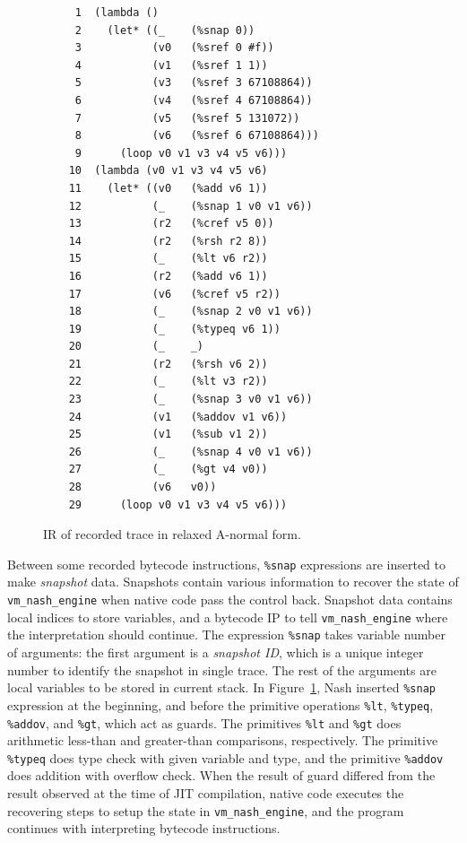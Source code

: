 \documentclass[preprint, 10pt]{sigplanconf}
\begin{document}
\begin{figure}
  \centering
  \small
\begin{verbatim}
     1	(lambda ()
     2    (let* ((_    (%snap 0))
     3           (v0   (%sref 0 #f))
     4           (v1   (%sref 1 1))
     5           (v3   (%sref 3 67108864))
     6           (v4   (%sref 4 67108864))
     7           (v5   (%sref 5 131072))
     8           (v6   (%sref 6 67108864)))
     9      (loop v0 v1 v3 v4 v5 v6)))
    10	(lambda (v0 v1 v3 v4 v5 v6)
    11    (let* ((v0   (%add v6 1))
    12           (_    (%snap 1 v0 v1 v6))
    13           (r2   (%cref v5 0))
    14           (r2   (%rsh r2 8))
    15           (_    (%lt v6 r2))
    16           (r2   (%add v6 1))
    17           (v6   (%cref v5 r2))
    18           (_    (%snap 2 v0 v1 v6))
    19           (_    (%typeq v6 1))
    20           (_    _)
    21           (r2   (%rsh v6 2))
    22           (_    (%lt v3 r2))
    23           (_    (%snap 3 v0 v1 v6))
    24           (v1   (%addov v1 v6))
    25           (v1   (%sub v1 2))
    26           (_    (%snap 4 v0 v1 v6))
    27           (_    (%gt v4 v0))
    28           (v6   v0))
    29      (loop v0 v1 v3 v4 v5 v6)))
\end{verbatim}
\caption{IR of recorded trace in relaxed A-normal form.}
\label{fig:anf}
\end{figure}

Between some recorded bytecode instructions, \texttt{\%snap} expressions are
inserted to make \textit{snapshot} data. Snapshots contain various information
to recover the state of \texttt{vm\_nash\_engine} when native code pass the
control back. Snapshot data contains local indices to store variables, and a
bytecode IP to tell \texttt{vm\_nash\_engine} where the interpretation should
continue. The expression \texttt{\%snap} takes variable number of arguments:
the first argument is a \textit{snapshot ID}, which is a unique integer number
to identify the snapshot in single trace. The rest of the arguments are local
variables to be stored in current stack. In
Figure~\hyperref[fig:anf]{\ref{fig:anf}}, Nash inserted \texttt{\%snap}
expression at the beginning, and before the primitive operations
\texttt{\%lt}, \texttt{\%typeq}, \texttt{\%addov}, and \texttt{\%gt}, which
act as guards. The primitives \texttt{\%lt} and \texttt{\%gt} does arithmetic
less-than and greater-than comparisons, respectively. The primitive
\texttt{\%typeq} does type check with given variable and type, and the
primitive \texttt{\%addov} does addition with overflow check. When the result
of guard differed from the result observed at the time of JIT compilation,
native code executes the recovering steps to setup the state in
\texttt{vm\_nash\_engine}, and the program continues with interpreting
bytecode instructions.
\end{document}
